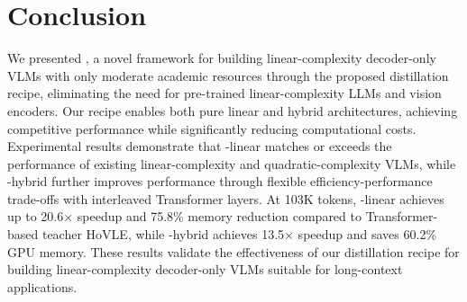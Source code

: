 \section{Conclusion}
We presented \name{}, a novel framework for building linear-complexity decoder-only VLMs with only moderate academic resources through the proposed distillation recipe, eliminating the need for pre-trained linear-complexity LLMs and vision encoders. Our recipe enables both pure linear and hybrid architectures, achieving competitive performance while significantly reducing computational costs. Experimental results demonstrate that \name{}-linear matches or exceeds the performance of existing linear-complexity and quadratic-complexity VLMs, while \name{}-hybrid further improves performance through flexible efficiency-performance trade-offs with interleaved Transformer layers. At 103K tokens, \name{}-linear achieves up to 20.6× speedup and 75.8\% memory reduction compared to Transformer-based teacher HoVLE, while \name{}-hybrid achieves 13.5$\times$ speedup and saves 60.2\% GPU memory. These results validate the effectiveness of our distillation recipe for building linear-complexity decoder-only VLMs suitable for long-context applications.
